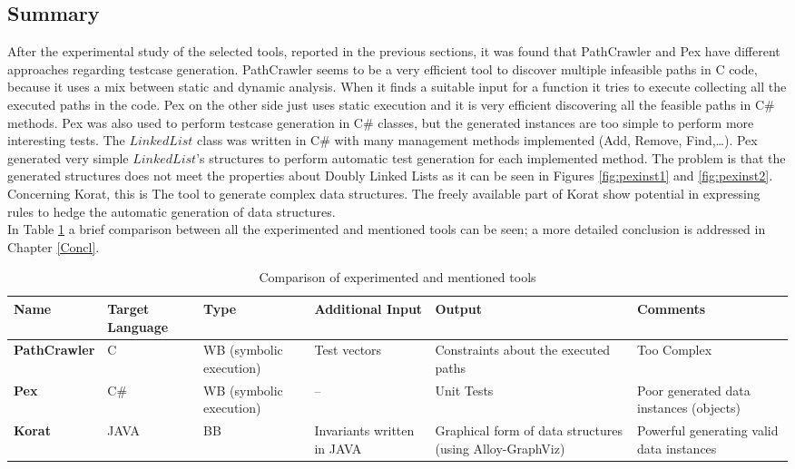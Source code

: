 \begin{code}
\section{Summary}
After the experimental study of the selected tools, reported in the previous sections, it was found that PathCrawler and Pex have different
approaches regarding testcase generation. PathCrawler seems to be a very efficient tool to discover multiple
infeasible paths in C code, because it uses a mix between static and dynamic analysis. When it finds a suitable input for a function it tries to execute
collecting all the executed paths in the code.
Pex on the other side just uses static execution and it is very efficient discovering all the feasible paths in C\# methods. Pex was also used
to perform testcase generation in C\# classes, but the generated instances are too simple to perform more interesting tests. The $LinkedList$ class was written
in C\# with many management methods implemented (Add, Remove, Find,\ldots). Pex generated very simple $LinkedList$'s structures to perform automatic test generation
for each implemented method. The problem is that the generated structures does not meet the properties about Doubly Linked Lists as it can be seen in Figures \ref{fig:pexinst1} and \ref{fig:pexinst2}.
Concerning Korat, this is The tool to generate complex data structures. The freely available part of Korat show potential in expressing rules to hedge
the automatic generation of data structures.\\
In Table \ref{tab:tabcmp} a brief comparison between all the experimented and mentioned tools can be seen; a more detailed conclusion is addressed in Chapter \ref{Concl}.

\begin{table}[!ht]
\centering
\begin{tabular}{|m{2.5cm}|m{1cm}|m{2cm}|m{2cm}|m{3.5cm}|m{3.5cm}|}\hline
\textbf{Name} & \textbf{Target Language} & \textbf{Type} & \textbf{Additional Input} & \textbf{Output} & \textbf{Comments}\\\hline
\textbf{PathCrawler} & C & \ac{WB} (symbolic execution) & Test vectors & Constraints about the executed paths & Too Complex\\\hline
\textbf{Pex} & C\# & \ac{WB} (symbolic execution) & -- & Unit Tests & Poor generated data instances (objects)\\\hline
\textbf{Korat} & JAVA & \ac{BB} & Invariants written in JAVA & Graphical form of data structures (using Alloy-GraphViz) & Powerful generating valid data instances\\\hline
\end{tabular}
\caption{Comparison of experimented and mentioned tools}
\label{tab:tabcmp}
\end{table}


\end{code}
